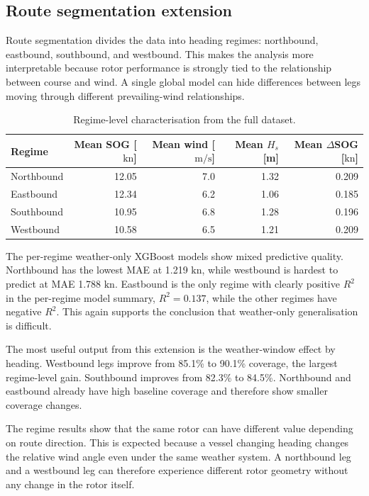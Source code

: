 \documentclass[10pt,a4paper]{article}
\newcommand{\kn}{\ensuremath{\mathrm{kn}}}
\newcommand{\ms}{\ensuremath{\mathrm{m/s}}}
\newcommand{\hs}{$H_s$}
\newcommand{\sog}{SOG}
\begin{document}
\subsection{Route segmentation extension}

Route segmentation divides the data into heading regimes: northbound,
eastbound, southbound, and westbound. This makes the analysis more interpretable
because rotor performance is strongly tied to the relationship between course
and wind. A single global model can hide differences between legs moving through
different prevailing-wind relationships.

\begin{table}[H]
\centering
\caption{Regime-level characterisation from the full dataset.}
\begin{tabular}{lrrrr}
\toprule
\textbf{Regime} & \textbf{Mean \sog{} [\kn]} & \textbf{Mean wind [\ms]} & \textbf{Mean \hs{} [m]} & \textbf{Mean $\Delta$\sog{} [\kn]} \\
\midrule
Northbound & 12.05 & 7.0 & 1.32 & 0.209 \\
Eastbound & 12.34 & 6.2 & 1.06 & 0.185 \\
Southbound & 10.95 & 6.8 & 1.28 & 0.196 \\
Westbound & 10.58 & 6.5 & 1.21 & 0.209 \\
\bottomrule
\end{tabular}
\end{table}

The per-regime weather-only XGBoost models show mixed predictive quality.
Northbound has the lowest MAE at 1.219 \kn{}, while westbound is hardest to
predict at MAE 1.788 \kn{}. Eastbound is the only regime with clearly positive
$R^2$ in the per-regime model summary, $R^2=0.137$, while the other regimes have
negative $R^2$. This again supports the conclusion that weather-only
generalisation is difficult.

The most useful output from this extension is the weather-window effect by
heading. Westbound legs improve from 85.1\% to 90.1\% coverage, the largest
regime-level gain. Southbound improves from 82.3\% to 84.5\%. Northbound and
eastbound already have high baseline coverage and therefore show smaller
coverage changes.

The regime results show that the same rotor can have different value depending
on route direction. This is expected because a vessel changing heading changes
the relative wind angle even under the same weather system. A northbound leg and
a westbound leg can therefore experience different rotor geometry without any
change in the rotor itself.
\end{document}

